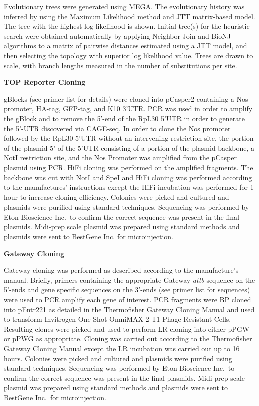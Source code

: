 \documentclass[12pt,oneside]{reedthesis}
\begin{document}
Evolutionary trees were generated using MEGA. The evolutionary history
was inferred by using the Maximum Likelihood method and JTT matrix-based
model. The tree with the highest log likelihood is shown. Initial
tree(s) for the heuristic search were obtained automatically by applying
Neighbor-Join and BioNJ algorithms to a matrix of pairwise distances
estimated using a JTT model, and then selecting the topology with
superior log likelihood value. Trees are drawn to scale, with branch
lengths measured in the number of substitutions per site.

\textbf{TOP Reporter Cloning}

gBlocks (see primer list for details) were cloned into pCasper2
containing a Nos promoter, HA-tag, GFP-tag, and K10 3'UTR. PCR was used
in order to amplify the gBlock and to remove the 5'-end of the RpL30
5'UTR in order to generate the 5'-UTR discovered via CAGE-seq. In order
to clone the Nos promoter followed by the RpL30 5'UTR without an
intervening restriction site, the portion of the plasmid 5' of the 5'UTR
consisting of a portion of the plasmid backbone, a NotI restriction
site, and the Nos Promoter was amplified from the pCasper plasmid using
PCR. HiFi cloning was performed on the amplified fragments. The backbone
was cut with NotI and SpeI and HiFi cloning was performed according to
the manufactures' instructions except the HiFi incubation was performed
for 1 hour to increase cloning efficiency. Colonies were picked and
cultured and plasmids were purified using standard techniques.
Sequencing was performed by Eton Bioscience Inc.~to confirm the correct
sequence was present in the final plasmids. Midi-prep scale plasmid was
prepared using standard methods and plasmids were sent to BestGene Inc.
for microinjection.

\textbf{Gateway Cloning}

Gateway cloning was performed as described according to the
manufacture's manual. Briefly, primers containing the appropriate
Gateway \emph{attb} sequence on the 5'-ends and gene specific sequences on
the 3'-ends (see primer list for sequences) were used to PCR amplify
each gene of interest. PCR fragments were BP cloned into pEntr221 as
detailed in the Thermofisher Gateway Cloning Manual and used to
transform Invitrogen One Shot OmniMAX 2 T1 Phage-Resistant Cells.
Resulting clones were picked and used to perform LR cloning into either
pPGW or pPWG as appropriate. Cloning was carried out according to the
Thermofisher Gateway Cloning Manual except the LR incubation was carried
out up to 16 hours. Colonies were picked and cultured and plasmids were
purified using standard techniques. Sequencing was performed by Eton
Bioscience Inc.~to confirm the correct sequence was present in the final
plasmids. Midi-prep scale plasmid was prepared using standard methods
and plasmids were sent to BestGene Inc.~for microinjection.
\end{document}
